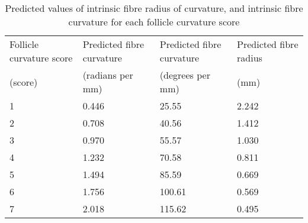 %

\begin{table}[h]
\centering
\caption{Predicted values of intrinsic fibre radius of curvature, and intrinsic fibre curvature for each follicle curvature score}
\label{tab:pred}
\vspace{0.1in}
\begin{tabular}{p{0.8in}|p{0.8in}|p{0.8in}|p{0.8in}}  \hline
  Follicle curvature score & Predicted fibre curvature  & Predicted fibre curvature & Predicted fibre radius  \\ 
  (score) & (radians per mm) & (degrees per mm)&  (mm)  \\ \hline
 1  & 0.446 & 25.55 & 2.242 \\
 2  & 0.708 & 40.56 & 1.412 \\
 3  & 0.970 & 55.57 & 1.030 \\
 4  & 1.232 & 70.58 & 0.811 \\
 5  & 1.494 & 85.59 & 0.669 \\
 6  & 1.756 & 100.61 & 0.569 \\
 7  & 2.018 & 115.62 & 0.495 \\ \hline
\end{tabular}
\end{table}

%
